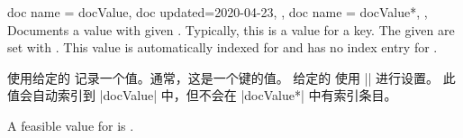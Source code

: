 \begin{docCommands}[doc parameter=\oarg{options}\marg{name}]
{
  {
    doc name = docValue,
    doc updated=2020-04-23,
  },
  {
    doc name = docValue*,
  },
}
Documents a value with given . Typically, this is a value for a key.
The given  are set with .
This value is automatically indexed for 
and has no index entry for .

使用给定的  记录一个值。通常，这是一个键的值。 给定的  使用 |\tcbset| 进行设置。 此值会自动索引到 |docValue| 中，但不会在 |docValue*| 中有索引条目。
\begin{dispExample}
A feasible value for  is .
\end{dispExample}
\end{docCommands}
